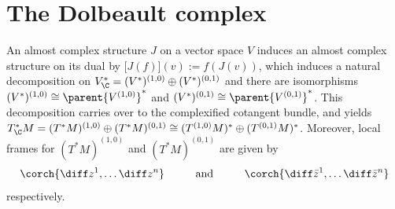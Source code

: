 \section{The Dolbeault complex} \label{sec_Dolbeault_complex}
An almost complex structure \(J\) on a vector space \(V\) induces an almost complex structure on its dual by \(\big[J(f)\big](v):=f(J(v))\), which induces a natural decomposition on \(V^*_\C=(V^*)^{(1,0)} \oplus (V^*)^{(0,1)}\) and there are isomorphisms \((V^*)^{(1,0)} \cong \parent{V^{(1,0)}}^*\) and \((V^*)^{(0,1)} \cong \parent{V^{(0,1)}}^*\). This decomposition carries over to the complexified cotangent bundle, and yields \(T_\C^*M =(T^*M)^{(1,0)} \oplus (T^*M)^{(0,1)} \cong (T^{(1,0)}M)^* \oplus (T^{(0,1)}M)^*\). Moreover, local frames for \((T^*M)^{(1,0)}\) and \((T^*M)^{(0,1)}\) are given by 
\begin{equation} \label{frames_of_compl_cotang}
\corch{\diff z^1, \ldots \diff z^n} \hspace{1 cm} \text{and} \hspace{1 cm} \corch{\diff \bar{z}^1, \ldots \diff \bar{z}^n}
\end{equation}
respectively. \\

